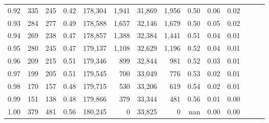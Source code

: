 \begin{tabular}{rrrrrrrrrrrrrr}
0.92 &    335 &  245 &  0.42 &  178,304 &    1,941 &  31,869 &   1,956 &  0.50 &  0.06 &      0.02 \\
0.93 &    284 &  277 &  0.49 &  178,588 &    1,657 &  32,146 &   1,679 &  0.50 &  0.05 &      0.02 \\
0.94 &    269 &  238 &  0.47 &  178,857 &    1,388 &  32,384 &   1,441 &  0.51 &  0.04 &      0.01 \\
0.95 &    280 &  245 &  0.47 &  179,137 &    1,108 &  32,629 &   1,196 &  0.52 &  0.04 &      0.01 \\
0.96 &    209 &  215 &  0.51 &  179,346 &      899 &  32,844 &     981 &  0.52 &  0.03 &      0.01 \\
0.97 &    199 &  205 &  0.51 &  179,545 &      700 &  33,049 &     776 &  0.53 &  0.02 &      0.01 \\
0.98 &    170 &  157 &  0.48 &  179,715 &      530 &  33,206 &     619 &  0.54 &  0.02 &      0.01 \\
0.99 &    151 &  138 &  0.48 &  179,866 &      379 &  33,344 &     481 &  0.56 &  0.01 &      0.00 \\
1.00 &    379 &  481 &  0.56 &  180,245 &        0 &  33,825 &       0 &   nan &  0.00 &      0.00 \\
\bottomrule
\end{tabular}
